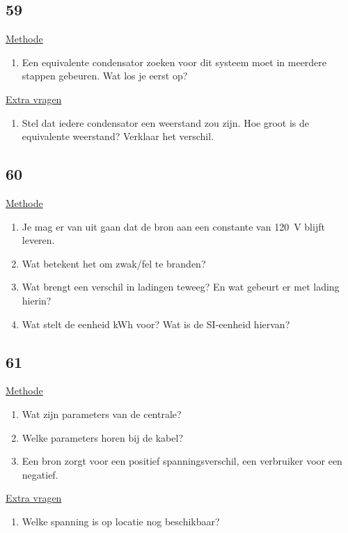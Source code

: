 \subsection*{59}
\underline{Methode}
\begin{enumerate}
	\item Een equivalente condensator zoeken voor dit systeem moet in meerdere stappen gebeuren. Wat los je eerst op?
\end{enumerate}

\underline{Extra vragen}
\begin{enumerate}
	\item Stel dat iedere condensator een weerstand zou zijn. Hoe groot is de equivalente weerstand? Verklaar het verschil.
\end{enumerate}




\subsection*{60}
\underline{Methode}
\begin{enumerate}
	\item Je mag er van uit gaan dat de bron aan een constante van 120~V blijft leveren. 
	\item Wat betekent het om zwak/fel te branden?
	\item Wat brengt een verschil in ladingen teweeg? En wat gebeurt er met lading hierin?
	\item Wat stelt de eenheid kWh voor? Wat is de SI-eenheid hiervan?
\end{enumerate}


\subsection*{61}
\underline{Methode}
\begin{enumerate}
	\item Wat zijn parameters van de centrale?
	\item Welke parameters horen bij de kabel?
	\item Een bron zorgt voor een positief spanningsverschil, een verbruiker voor een negatief.
\end{enumerate}

\underline{Extra vragen}
\begin{enumerate}
	\item Welke spanning is op locatie nog beschikbaar?
\end{enumerate}



